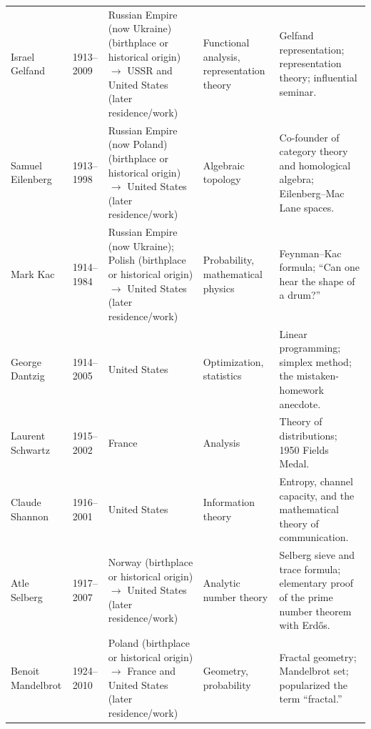 {\begin{longtable}{@{}L{0.145\textwidth}L{0.09\textwidth}L{0.225\textwidth}L{0.14\textwidth}L{0.30\textwidth}@{}}
        Israel Gelfand
        & 1913--2009
        & Russian Empire (now Ukraine) (birthplace or historical origin) \(\to\) USSR and United States (later residence/work)
        & Functional analysis, representation theory
        & Gelfand representation; representation theory; influential seminar. \\

        Samuel Eilenberg
        & 1913--1998
        & Russian Empire (now Poland) (birthplace or historical origin) \(\to\) United States (later residence/work)
        & Algebraic topology
        & Co-founder of category theory and homological algebra;
          Eilenberg--Mac Lane spaces. \\

        Mark Kac
        & 1914--1984
        & Russian Empire (now Ukraine); Polish (birthplace or historical origin) \(\to\) United States (later residence/work)
        & Probability, mathematical physics
        & Feynman--Kac formula; ``Can one hear the shape of a drum?'' \\

        George Dantzig
        & 1914--2005
        & United States
        & Optimization, statistics
        & Linear programming; simplex method; the mistaken-homework anecdote. \\

        Laurent Schwartz
        & 1915--2002
        & France
        & Analysis
        & Theory of distributions; 1950 Fields Medal. \\

        Claude Shannon
        & 1916--2001
        & United States
        & Information theory
        & Entropy, channel capacity, and the mathematical theory of
          communication. \\

        Atle Selberg
        & 1917--2007
        & Norway (birthplace or historical origin) \(\to\) United States (later residence/work)
        & Analytic number theory
        & Selberg sieve and trace formula; elementary proof of the prime number
          theorem with Erd\H{o}s. \\

        Benoit Mandelbrot
        & 1924--2010
        & Poland (birthplace or historical origin) \(\to\) France and United States (later residence/work)
        & Geometry, probability
        & Fractal geometry; Mandelbrot set; popularized the term ``fractal.'' \\


\end{longtable}}
